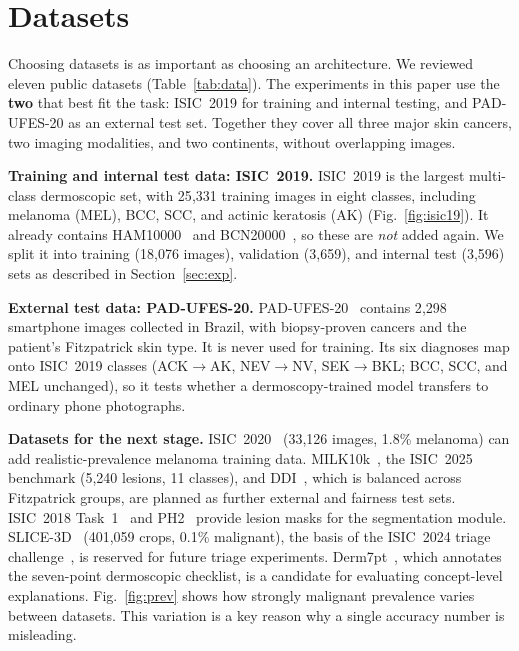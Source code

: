 \section{Datasets}\label{sec:data}
Choosing datasets is as important as choosing an architecture. We
reviewed eleven public datasets (Table~\ref{tab:data}). The experiments
in this paper use the \textbf{two} that best fit the task: ISIC~2019 for
training and internal testing, and PAD-UFES-20 as an external test set.
Together they cover all three major skin cancers, two imaging
modalities, and two continents, without overlapping images.

\textbf{Training and internal test data: ISIC~2019.} ISIC~2019 is the
largest multi-class dermoscopic set, with 25{,}331 training images in
eight classes, including melanoma (MEL), BCC, SCC, and actinic keratosis
(AK) (Fig.~\ref{fig:isic19}). It already contains
HAM10000~\cite{tschandl2018ham10000} and
BCN20000~\cite{hernandez2024bcn20000}, so these are \emph{not} added
again. We split it into training (18{,}076 images), validation (3{,}659),
and internal test (3{,}596) sets as described in
Section~\ref{sec:exp}.

\textbf{External test data: PAD-UFES-20.}
PAD-UFES-20~\cite{pacheco2020padufes20} contains 2{,}298 smartphone
images collected in Brazil, with biopsy-proven cancers and the
patient's Fitzpatrick skin type. It is never used for training. Its six
diagnoses map onto ISIC~2019 classes (ACK$\rightarrow$AK,
NEV$\rightarrow$NV, SEK$\rightarrow$BKL; BCC, SCC, and MEL unchanged),
so it tests whether a dermoscopy-trained model transfers to ordinary
phone photographs.

\textbf{Datasets for the next stage.} ISIC~2020~\cite{rotemberg2021isic2020}
(33{,}126 images, 1.8\% melanoma) can add realistic-prevalence melanoma
training data. MILK10k~\cite{tschandl2026milk10k}, the ISIC~2025
benchmark (5{,}240 lesions, 11 classes), and DDI~\cite{daneshjou2022ddi},
which is balanced across Fitzpatrick groups, are planned as further
external and fairness test sets. ISIC~2018 Task~1~\cite{codella2019isic2018}
and PH2~\cite{mendonca2013ph2} provide lesion masks for the segmentation
module. SLICE-3D~\cite{kurtansky2024slice3d} (401{,}059 crops, 0.1\%
malignant), the basis of the ISIC~2024 triage challenge~\cite{kurtansky2025},
is reserved for future triage experiments. Derm7pt~\cite{kawahara2019derm7pt},
which annotates the seven-point dermoscopic checklist, is a candidate
for evaluating concept-level explanations. Fig.~\ref{fig:prev} shows
how strongly malignant prevalence varies between datasets. This
variation is a key reason why a single accuracy number is misleading.

